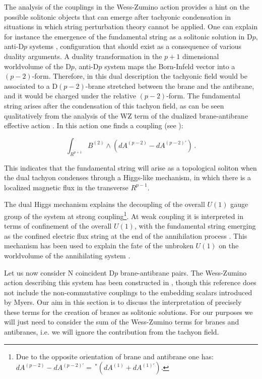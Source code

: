 \documentclass[12pt,a4paper]{article}
\begin{document}
The analysis of the
couplings in the Wess-Zumino action   
provides a hint on the possible solitonic objects
that can emerge after tachyonic condensation 
in situations in which string perturbation theory 
cannot be applied.
One can explain for instance the emergence of the
fundamental string as a solitonic solution in D$p$, anti-D$p$
systems \cite{Yi,HL1}, configuration that should exist as a
consequence of various duality arguments. A duality transformation
in the $p+1$ dimensional worldvolume of the D$p$, anti-D$p$ system
maps the Born-Infeld vector into a $(p-2)$-form. Therefore, in
this dual description the tachyonic field would be associated to
a D$(p-2)$-brane stretched between the brane and the antibrane, and
it would be charged under the relative $(p-2)$-form.
The fundamental string arises after the condensation of this tachyon
field, as can be seen 
qualitatively from the
analysis of the WZ term of the dualized brane-antibrane
effective action \cite{Yi,HL1}. In this action one finds a 
coupling (see \cite{HL1}):

\begin{equation}
\int_{R^{p+1}}B^{(2)}\wedge (dA^{(p-2)}-dA^{(p-2)\prime})\, .
\end{equation}

\noindent This indicates 
that the fundamental string will arise as a topological soliton 
when the dual tachyon condenses through a Higgs-like mechanism,
in which there is a localized magnetic flux in the transverse
$R^{p-1}$.

The dual Higgs mechanism explains the decoupling of the
overall $U(1)$ gauge group of the system at strong 
coupling\footnote{Due to the opposite orientation of brane and
antibrane one has: $dA^{(p-2)}-dA^{(p-2)\prime}=\,^*(dA^{(1)}+
dA^{(1)\prime})$.}. 
At weak coupling it is interpreted in terms of 
confinement of the overall $U(1)$,
with the fundamental string emerging as the confined electric
flux string at the end of the annihilation process \cite{BHY}.
This mechanism has been used to explain the fate of the unbroken
$U(1)$ on the worldvolume of the annihilating system \cite{Yi}.


Let us now consider N coincident D$p$ brane-antibrane pairs.
The Wess-Zumino action describing this system has been constructed
in \cite{KW}, though this reference does not include the 
non-commutative couplings
to the embedding scalars introduced by Myers. Our aim in this section
is to discuss the interpretation of precisely these terms for the
creation of branes as solitonic solutions. For our purposes we will just
need to consider the sum of the
Wess-Zumino terms for branes and antibranes, i.e. we will ignore the
contribution from the tachyon field.
 
\end{document}
